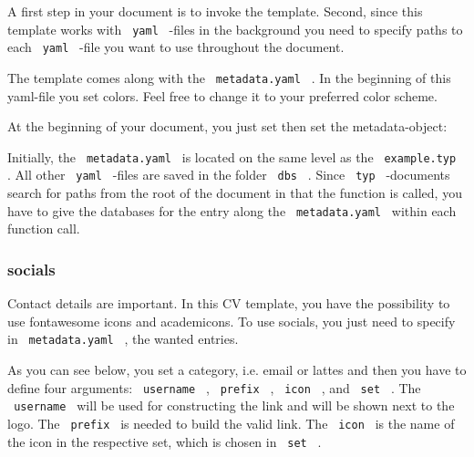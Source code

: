 A first step in your document is to invoke the template. Second, since
this template works with \texttt{\ yaml\ } -files in the background you
need to specify paths to each \texttt{\ yaml\ } -file you want to use
throughout the document.

The template comes along with the \texttt{\ metadata.yaml\ } . In the
beginning of this yaml-file you set colors. Feel free to change it to
your preferred color scheme.

\begin{Shaded}
\begin{Highlighting}[]
\KeywordTok{:}
\AttributeTok{  }\KeywordTok{:}\AttributeTok{ }
\AttributeTok{  }\KeywordTok{:}\AttributeTok{ }
\AttributeTok{  }\KeywordTok{:}\AttributeTok{ }
\end{Highlighting}
\end{Shaded}

At the beginning of your document, you just set then set the
metadata-object:

\begin{Shaded}
\begin{Highlighting}[]

\end{Highlighting}
\end{Shaded}

Initially, the \texttt{\ metadata.yaml\ } is located on the same level
as the \texttt{\ example.typ\ } . All other \texttt{\ yaml\ } -files are
saved in the folder \texttt{\ dbs\ } . Since \texttt{\ typ\ } -documents
search for paths from the root of the document in that the function is
called, you have to give the databases for the entry along the
\texttt{\ metadata.yaml\ } within each function call.

\subsubsection{socials}\label{socials}

Contact details are important. In this CV template, you have the
possibility to use fontawesome icons and academicons. To use socials,
you just need to specify in \texttt{\ metadata.yaml\ } , the wanted
entries.

As you can see below, you set a category, i.e. email or lattes and then
you have to define four arguments: \texttt{\ username\ } ,
\texttt{\ prefix\ } , \texttt{\ icon\ } , and \texttt{\ set\ } . The
\texttt{\ username\ } will be used for constructing the link and will be
shown next to the logo. The \texttt{\ prefix\ } is needed to build the
valid link. The \texttt{\ icon\ } is the name of the icon in the
respective set, which is chosen in \texttt{\ set\ } .

